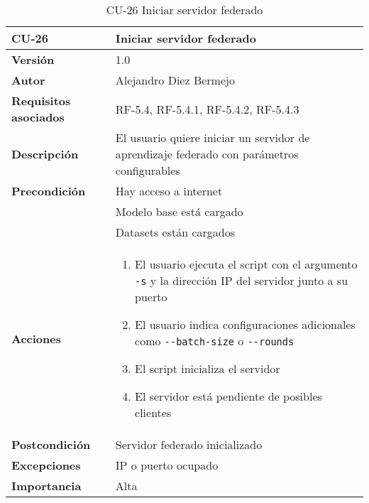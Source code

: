 \begin{table}[p]
	\centering
	\begin{tabularx}{\linewidth}{ p{} p{} }
		\toprule
		\textbf{CU-26}    & \textbf{Iniciar servidor federado}\\
		\toprule
		\textbf{Versión}              & 1.0    \\
		\textbf{Autor}                & Alejandro Diez Bermejo \\
		\textbf{Requisitos asociados} & RF-5.4, RF-5.4.1, RF-5.4.2, RF-5.4.3 \\
		\textbf{Descripción}          & El usuario quiere iniciar un servidor de aprendizaje federado con parámetros configurables \\
        \textbf{Precondición}         & Hay acceso a internet \\
                                      & Modelo base está cargado \\
                                      & Datasets están cargados \\
		\textbf{Acciones}             &
		\begin{enumerate}
			\def\labelenumi{\arabic{enumi}.}
			\tightlist
            \item El usuario ejecuta el script con el argumento \texttt{-s} y la dirección IP del servidor junto a su puerto
            \item El usuario indica configuraciones adicionales como \texttt{-{}-batch-size} o \texttt{-{}-rounds}
            \item El script inicializa el servidor
            \item El servidor está pendiente de posibles clientes
		\end{enumerate}\\
		\textbf{Postcondición}        & Servidor federado inicializado \\
		\textbf{Excepciones}          & IP o puerto ocupado \\
		\textbf{Importancia}          & Alta \\
		\bottomrule
	\end{tabularx}
	\caption{CU-26 Iniciar servidor federado}
\end{table}

